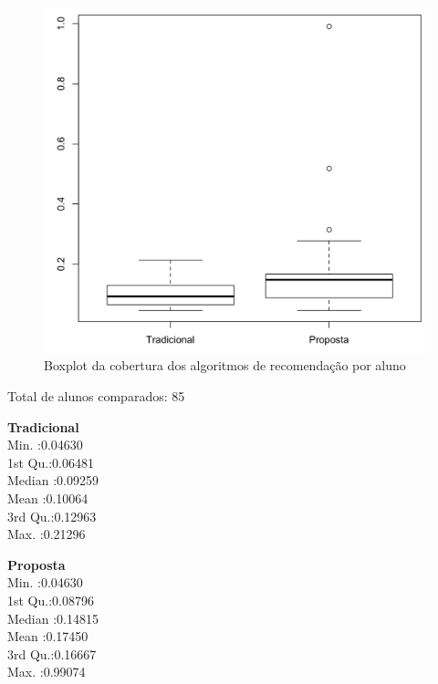 \begin{figure}[htb]
  \caption{\label{fig:coverage-boxplot}Boxplot da cobertura dos algoritmos de recomendação por aluno}
  \begin{center}
      \includegraphics[scale=0.4]{./Figuras/coverage-boxplot.png}
  \end{center}
\end{figure}

Total de alunos comparados: 85

\begin{multicols}{2}

\noindent\textbf{Tradicional}\\
Min.   :0.04630\\
1st Qu.:0.06481\\
Median :0.09259\\
Mean   :0.10064\\
3rd Qu.:0.12963\\
Max.   :0.21296\\

\columnbreak

\noindent\textbf{Proposta}\\
Min.   :0.04630\\
1st Qu.:0.08796\\
Median :0.14815\\
Mean   :0.17450\\
3rd Qu.:0.16667\\
Max.   :0.99074
\end{multicols}

